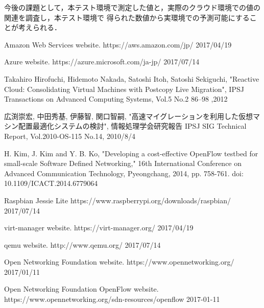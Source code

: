 \documentclass[submit,techrep]{ipsj}
\begin{document}
今後の課題として，本テスト環境で測定した値と，実際のクラウド環境での値の関連を調査し，本テスト環境で
得られた数値から実環境での予測可能にすることが考えられる．



\begin{thebibliography}{10}
  Amazon Web Services website. https://aws.amazon.com/jp/ 2017/04/19

	Azure website. https://azure.microsoft.com/ja-jp/ 2017/07/14

  Takahiro Hirofuchi, Hidemoto Nakada, Satoshi Itoh, Satoshi Sekiguchi, "Reactive Cloud: Consolidating Virtual Machines with Postcopy Live Migration", IPSJ Transactions on Advanced Computing Systems, Vol.5 No.2 86–98 ,2012

  広渕崇宏, 中田秀基, 伊藤智, 関口智嗣, "高速マイグレーションを利用した仮想マシン配置最適化システムの検討", 情報処理学会研究報告 IPSJ SIG Technical Report, Vol.2010-OS-115 No.14, 2010/8/4

  H. Kim, J. Kim and Y. B. Ko, "Developing a cost-effective OpenFlow testbed for small-scale Software Defined Networking," 16th International Conference on Advanced Communication Technology, Pyeongchang, 2014, pp. 758-761.
  doi: 10.1109/ICACT.2014.6779064

  Raspbian Jessie Lite https://www.raspberrypi.org/downloads/raspbian/ 2017/07/14

  virt-manager website. https://virt-manager.org/ 2017/04/19

  qemu website. http://www.qemu.org/ 2017/07/14

  Open Networking Foundation website. https://www.opennetworking.org/ 2017/01/11

  Open Networking Foundation OpenFlow website. https://www.opennetworking.org/sdn-resources/openflow 2017-01-11




\end{thebibliography}
\end{document}
